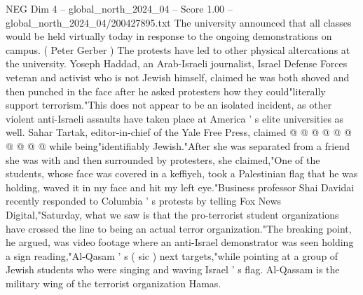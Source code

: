 \begin{textsample}{NEG Dim 4 – global\_north\_2024\_04 – Score 1.00 – global\_north\_2024\_04/200427895.txt}
The university announced that all classes would be held virtually today in response to the ongoing demonstrations on campus. ( Peter Gerber ) The protests have led to other physical altercations at the university.
Yoseph Haddad, an Arab-Israeli journalist, Israel Defense Forces veteran and activist who is not Jewish himself, claimed he was both shoved and then punched in the face after he asked protesters how they could"literally support terrorism."This does not appear to be an isolated incident, as other violent anti-Israeli assaults have taken place at America ' s elite universities as well.
Sahar Tartak, editor-in-chief of the Yale Free Press, claimed @ @ @ @ @ @ @ @ @ @ while being"identifiably Jewish."After she was separated from a friend she was with and then surrounded by protesters, she claimed,"One of the students, whose face was covered in a keffiyeh, took a Palestinian flag that he was holding, waved it in my face and hit my left eye."Business professor Shai Davidai recently responded to Columbia ' s protests by telling Fox News Digital,"Saturday, what we saw is that the pro-terrorist student organizations have crossed the line to being an actual terror organization."The breaking point, he argued, was video footage where an anti-Israel demonstrator was seen holding a sign reading,"Al-Qasam ' s ( sic ) next targets,"while pointing at a group of Jewish students who were singing and waving Israel ' s flag.
Al-Qassam is the military wing of the terrorist organization Hamas.

\end{textsample}
